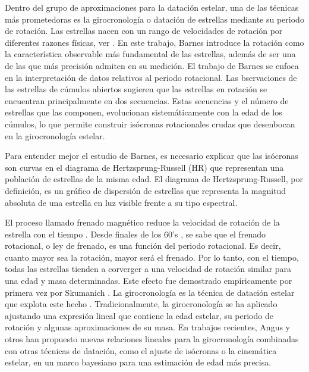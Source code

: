 Dentro del grupo de aproximaciones para la datación estelar, una de las técnicas más prometedoras es la girocronología o datación de estrellas mediante su periodo de rotación. Las estrellas nacen con un rango de velocidades de rotación por diferentes razones físicas, ver \cite{Barnes03}. En este trabajo, Barnes introduce la rotación como la característica observable más fundamental de las estrellas, además de ser una de las que más precisión admiten en su medición. El trabajo de Barnes se enfoca en la interpretación de datos relativos al periodo rotacional. Las bservaciones de las estrellas de cúmulos abiertos sugieren que las estrellas en rotación se encuentran principalmente en dos secuencias. Estas secuencias y el número de estrellas que las componen, evolucionan sistemáticamente con la edad de los cúmulos, lo que permite construir isócronas rotacionales crudas que desenbocan en la girocronología estelar.

Para entender mejor el estudio de Barnes, es necesario explicar que las isócronas son curvas en el diagrama de Hertzsprung-Russell (HR) que representan una población de estrellas de la misma edad. El diagrama de Hertzsprung-Russell, por definición, es un gráfico de dispersión de estrellas que representa la magnitud absoluta de una estrella en luz visible frente a su tipo espectral.

El proceso llamado frenado magnético reduce la velocidad de rotación de la estrella con el tiempo \cite{Schatzman62}. Desde finales de los 60's \cite{Belcher76, Kawaler88, Mestel68, Mestel87, Weber67}, se sabe que el frenado rotacional, o ley de frenado, es una función del periodo rotacional. Es decir, cuanto mayor sea la rotación, mayor será el frenado. Por lo tanto, con el tiempo, todas las estrellas tienden a corverger a una velocidad de rotación similar para una edad y masa determinadas. Este efecto fue demostrado empíricamente por primera vez por Skumanich \cite{Skumanich72}. La girocronología es la técnica de datación estelar que explota este hecho \cite{Barnes16, Soderblom15}. Tradicionalmente, la girocronología se ha aplicado ajustando una expresión lineal que contiene la edad estelar, su periodo de rotación y algunas aproximaciones de su masa. En trabajos recientes, Angus y otros \cite{Angus20} \cite{Angus19} han propuesto nuevas relaciones lineales para la girocronología combinadas con otras técnicas de datación, como el ajuste de isócronas o la cinemática estelar, en un marco bayesiano para una estimación de edad más precisa. 

